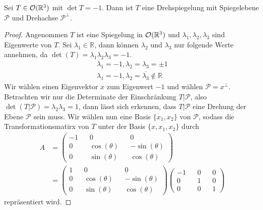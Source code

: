 \newpage
\begin{theorem}
 Sei $T\in{\mathcal{O}(\mathbb{R}^3)}$ mit $\det T = -1$. Dann ist $T$ eine Drehspiegelung mit Spiegelebene $\mathcal{P}$ und Drehachse $\mathcal{P}^{\perp}$.
\end{theorem}
\begin{proof}
 Angenommen $T$ ist eine Spiegelung in ${\mathcal{O}(\mathbb{R}^3)}$ und $\lambda_1,\lambda_2,\lambda_3$ sind Eigenwerte von $T$. Sei $\lambda_1 \in \mathbb{R}$, dann können $\lambda_2$ und $\lambda_3$ nur folgende Werte annehmen, da $\det(T)=\lambda_1\lambda_2\lambda_3=-1$.
 \setcounter{equation}{0}
 \begin{align}
  \lambda_1=-1, \lambda_2=\lambda_3=\pm1 \\
  \lambda_1=-1, \lambda_2=\overline{\lambda_3}\notin \mathbb{R}
 \end{align}
 Wir wählen einen Eigenvektor $x$ zum Eigenwert $-1$ und wählen $\mathcal{P}=x^{\perp}$. Betrachten wir nur die Determinate der Einschränkung $T|\mathcal{P}$, also $\det(T|\mathcal{P})=\lambda_2\lambda_3=1$, dann lässt sich erkennen, dass $T|\mathcal{P}$ eine Drehung der Ebene $\mathcal{P}$ sein muss. Wir wählen nun eine Basis $\{x_1,x_2\}$ von $\mathcal{P}$, sodass die Transformationsmatirx von $T$ unter der Basis $\{x,x_1,x_2\}$ durch \begin{align*}
  A&=
\begin{pmatrix}
        -1 && 0 && 0 \\
        0 && \cos(\theta) && -\sin(\theta) \\
        0 && \sin(\theta) && \cos(\theta)
       \end{pmatrix} \\ &=
       \begin{pmatrix}
        1 && 0 && 0 \\
        0 && \cos(\theta) && -\sin(\theta) \\
        0 && \sin(\theta) && \cos(\theta)
       \end{pmatrix} 
       \begin{pmatrix}
        -1 && 0 && 0 \\
        0 && 1 && 0 \\
        0 && 0 && 1
       \end{pmatrix}
 \end{align*}
repräsentiert wird.
\end{proof}



